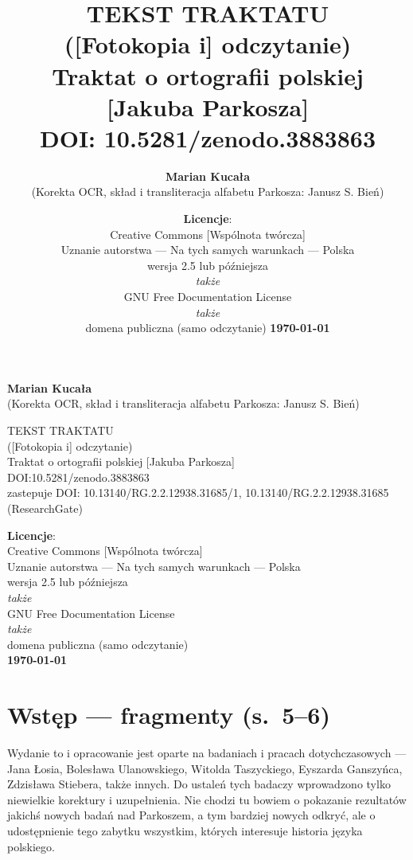 \documentclass[dvipsnames,12pt]{report}
\author{\textbf{Marian Kucała}\\(Korekta OCR, skład i transliteracja alfabetu Parkosza: Janusz S. Bień)}
\title{TEKST TRAKTATU\\[-.5ex]([Fotokopia i] odczytanie)\\[-.5ex]Traktat o ortografii polskiej [Jakuba Parkosza]\\DOI: 10.5281/zenodo.3883863}
\date{\textbf{Licencje}:\\ \relsize{-1}Creative Commons [Wspólnota twórcza]\\[-.4ex]
Uznanie autorstwa --- Na tych samych warunkach --- Polska\\
wersja 2.5 lub późniejsza\\\textit{także}\\
GNU Free Documentation License\\\textit{także}\\
domena publiczna (samo odczytanie)
\textbf{\today}}
\begin{document}
\thispagestyle{empty}

\begin{titlepage}
{\textbf{Marian Kucała}\\(Korekta OCR, skład i transliteracja alfabetu Parkosza: Janusz S. Bień)} 

\vfill { {TEKST TRAKTATU\\[-.5ex]([Fotokopia i]
    odczytanie)\\[-.5ex]Traktat o ortografii polskiej [Jakuba
    Parkosza]}\\ DOI:10.5281/zenodo.3883863\\ zastepuje
  DOI: 10.13140/RG.2.2.12938.31685/1, 10.13140/RG.2.2.12938.31685
  (ResearchGate)}

\vfill
{\textbf{Licencje}:\\ Creative Commons [Wspólnota twórcza]\\[-.4ex]
Uznanie autorstwa --- Na tych samych warunkach --- Polska\\
wersja 2.5 lub późniejsza\\\textit{także}\\
GNU Free Documentation License\\\textit{także}\\
domena publiczna (samo odczytanie)\\
\textbf{\today}}

\end{titlepage}

{}



\raggedright

\section*{Wstęp --- fragmenty (s.~5--6)}
\label{sec:wstp}
Wydanie to i opracowanie jest oparte na badaniach i pracach
dotychczasowych — Jana Łosia, Bolesława Ulanowskiego, Witolda
Taszyckiego, Eyszarda Ganszyńca, Zdzisława Stiebera, także innych. Do
ustaleń tych badaczy wprowadzono tylko niewielkie korektury i
uzupełnienia. Nie chodzi tu bowiem o pokazanie rezultatów jakichś
nowych badań nad Parkoszem, a tym bardziej nowych odkryć, ale o
udostępnienie tego zabytku wszystkim, których interesuje historia
języka polskiego.
\end{document}
